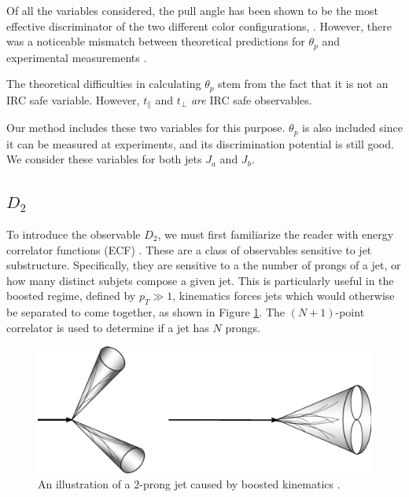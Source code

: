 \documentclass[10pt,a4paper]{book}
\begin{document}
Of all the variables considered, the pull angle has been shown to be the most effective discriminator of the two different color configurations, \cite{Gallicchio:2010sw}. However, there was a noticeable mismatch between theoretical predictions for $\theta_p$ and experimental measurements \cite{Larkoski:2019urm}. 

The theoretical difficulties in calculating $\theta_p$ stem from the fact that it is not an IRC safe variable. However, $t_\parallel$ and $t_\perp$ \emph{are} IRC safe observables. 

Our method includes these two variables for this purpose. $\theta_p$ is also included since it can be measured at experiments, and its discrimination potential is still good. We consider these variables for both jets $J_a$ and $J_b$. 

\subsection{$D_2$}

To introduce the observable $D_2$, we must first familiarize the reader with energy correlator functions (ECF) \cite{Larkoski:2013eya}. These are a class of observables sensitive to jet substructure. Specifically, they are sensitive to a the number of prongs of a jet, or how many distinct subjets compose a given jet. This is particularly useful in the boosted regime, defined by $p_T \gg 1$, kinematics forces jets which would otherwise be separated to come together, as shown in Figure \ref{two pronged boost}. The $(N+1)$-point correlator is used to determine if a jet has $N$ prongs.

\begin{figure}[ht]
\centering
\includegraphics[scale=0.35]{ch4_images/two_prong}
\caption{An illustration of a 2-prong jet caused by boosted kinematics \cite{jet_image}.}
\label{two pronged boost}
\end{figure}
\end{document}
